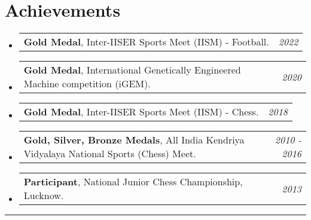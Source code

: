 \documentclass[a4paper,11pt]{article}
\makeatletter
\newcommand{\resumePOR}[3]{
\vspace{0.5mm}\item
    \begin{tabular*}{0.97\textwidth}[t]{l@{\extracolsep{\fill}}r}
        \textbf{#1}, \hspace{0.3mm}#2 & \textit{\small{#3}} 
    \end{tabular*}
    \vspace{-2mm}
}
\newcommand{\resumeSubHeadingListStart}{\begin{itemize}[leftmargin=*,labelsep=0mm]}
\newcommand{\resumeSubHeadingListEnd}{\end{itemize}\vspace{2mm}}
\makeatother
\begin{document}
\section{Achievements}
\vspace{-0.2mm}
\resumeSubHeadingListStart
\resumePOR{Gold Medal} %
    {Inter-IISER Sports Meet (IISM) - Football.} %
    {2022} %
    
\resumePOR{Gold Medal} %
    {International Genetically Engineered Machine competition (iGEM).} %
    {2020} %

\resumePOR{Gold Medal} %
    {Inter-IISER Sports Meet (IISM) - Chess.} %
    {2018} %

\resumePOR{Gold, Silver, Bronze Medals} %
    {All India Kendriya Vidyalaya National Sports (Chess) Meet.} %
    {2010 - 2016} %

\resumePOR{Participant} %
    {National Junior Chess Championship, Lucknow.} %
    {2013} %

\resumeSubHeadingListEnd
\hspace*{-5mm}\rule{1.035\textwidth}{0.1mm}

\end{document}
